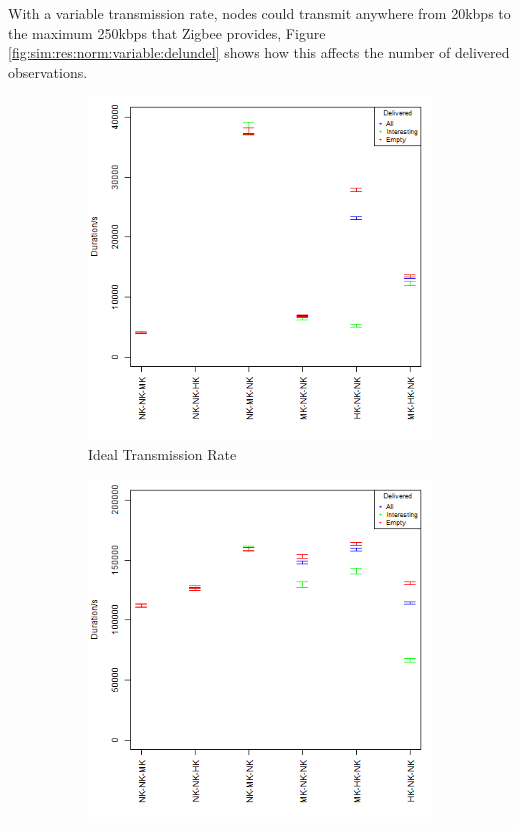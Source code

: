 With a variable transmission rate, nodes could transmit anywhere from 20kbps to the maximum 250kbps that Zigbee provides, Figure \ref{fig:sim:res:norm:variable:delundel} shows how this affects the number of delivered observations. 

\begin{figure}

\begin{subfigure}{\textwidth}
\centering
  \includegraphics[height=.5\textheight]{Chap7/figures/plots/normal_ideal/delivered_mean.png}
  \caption{Ideal Transmission Rate}
\label{fig:sim:res:norm:ideal:delmean}
\end{subfigure}%
\vfill
\begin{subfigure}{\textwidth}
\centering
  \includegraphics[height=.5\textheight]{Chap7/figures/plots/normal_variable/delivered_mean.png}

\end{subfigure}
\end{figure}
